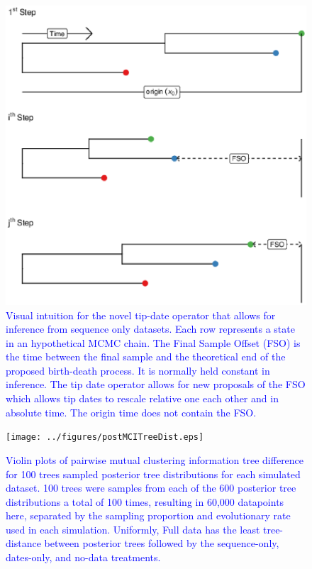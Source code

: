 \documentclass{article}
\begin{document}
\begin{figure}[H]
\centering
\includegraphics[width=1\linewidth]{../figures/tipDateOp.eps}
\caption{\textcolor{blue}{Visual intuition for the novel tip-date operator that allows for inference from sequence only datasets. Each row represents a state in an hypothetical MCMC chain. The Final Sample Offset (FSO) is the time between the final sample and the theoretical end of the proposed birth-death process. It is normally held constant in inference. The tip date operator allows for new proposals of the FSO which allows tip dates to rescale relative one each other and in absolute time. The origin time does not contain the FSO.}}
\label{fig:tipOp}
\end{figure}

\begin{figure}[H]
\centering
\texttt{[image: ../figures/postMCITreeDist.eps]}
\caption{\textcolor{blue}{Violin plots of pairwise mutual clustering information tree difference for 100 trees sampled posterior tree distributions for each simulated dataset. 100 trees were samples from each of the 600 posterior tree distributions a total of 100 times, resulting in 60,000 datapoints here, separated by the sampling proportion and evolutionary rate used in each simulation. Uniformly, Full data has the least tree-distance between posterior trees followed by the sequence-only, dates-only, and no-data treatments.}}
\label{fig:ptreeDist}
\end{figure}
\end{document}
